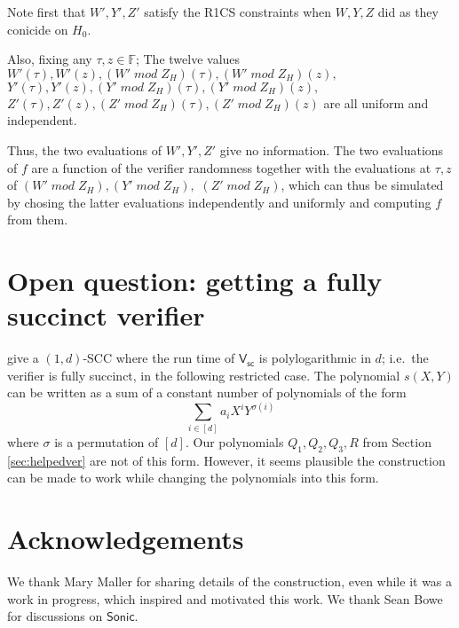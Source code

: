 \documentclass[11pt]{article}
\numberwithin{figure}{section} %
\newcommand{\F}{\ensuremath{\mathbb F}\xspace}
\newcommand{\sonic}{\ensuremath{\mathsf{Sonic}}\xspace}
\newcommand{\sigver}{\ensuremath{\mathsf{V_{sc}}}\xspace}
\begin{document}
Note first that $W',Y',Z'$ satisfy the R1CS constraints when $W,Y,Z$ did
as they conicide on $H_0$.

Also, fixing any $\tau,z\in \F$;
The twelve values $W'(\tau),W'(z),(W' \;mod\; Z_H)(\tau), (W' \;mod\; Z_H)(z),$ $Y'(\tau),Y'(z),(Y' \;mod\; Z_H)(\tau), (Y' \;mod \;Z_H)(z),$ $Z'(\tau),Z'(z),(Z' \;mod\; Z_H)(\tau), (Z' \;mod\; Z_H)(z)$
are all uniform and independent.

Thus, the two evaluations of $W',Y',Z'$ give no information.
The two evaluations of $f$ are a function of the verifier randomness together with the evaluations at $\tau,z$ of $(W' \;mod\; Z_H),(Y' \;mod\; Z_H),$ $(Z' \;mod\; Z_H)$,
which can thus be simulated by chosing the latter evaluations independently and uniformly and computing $f$ from them.

\section{Open question: getting a fully succinct verifier}\label{sec:succinctver}
\cite{sonic} give a $(1,d)$-SCC where the run time of \sigver is polylogarithmic in $d$; i.e.\ the verifier is fully succinct, in the following restricted case.
The polynomial $s(X,Y)$ can be written as a sum of a constant number of polynomials of the form
\[\sum_{i\in [d]} a_iX^i Y^{\sigma(i)}\]
where $\sigma$ is a permutation of $[d]$.
Our polynomials $Q_1,Q_2,Q_3,R$ from Section \ref{sec:helpedver} are not of this form.
However, it seems plausible the construction can be made to work while changing the polynomials into this form.


 \section*{Acknowledgements}
We thank Mary Maller for sharing details of the \cite{sonic} construction, even while it was a work in progress, which inspired and motivated this work. We thank Sean Bowe for discussions on \sonic.

 

\end{document}
